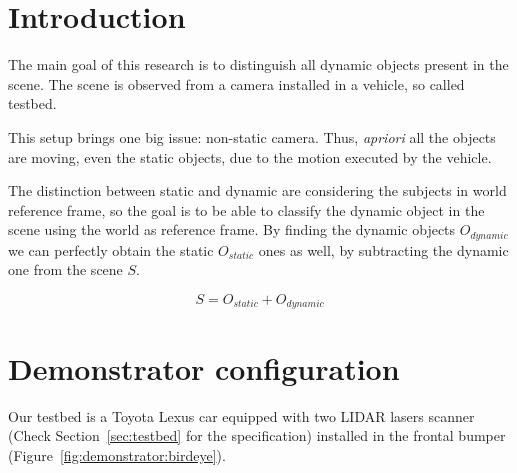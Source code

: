 
\section{Introduction}

The main goal of this research is to distinguish all dynamic objects present in the scene. The scene is observed from a camera installed in a vehicle, so called testbed.

This setup brings one big issue: non-static camera. Thus, \textit{apriori} all the objects are moving, even the static objects, due to the motion executed by the vehicle.

The distinction between static and dynamic are considering the subjects in world reference frame, so the goal is to be able to classify the dynamic object in the scene using the world as reference frame. By finding the dynamic objects $O_{dynamic}$ we can perfectly obtain the static $O_{static}$ ones as well, by subtracting the dynamic one from the scene $S$.

\begin{equation}
S=O_{static}+O_{dynamic}
\end{equation}

\section{Demonstrator configuration} %
\label{sec:demonstrator}

Our testbed is a Toyota Lexus car equipped with two LIDAR lasers scanner (Check Section~\ref{sec:testbed} for the specification) installed in the frontal bumper (Figure~\ref{fig:demonstrator:birdeye}).

